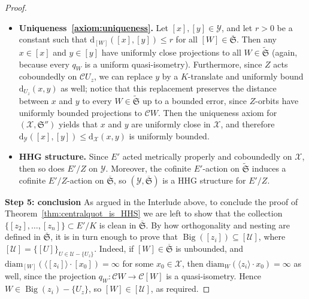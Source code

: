 \documentclass[svgnames]{amsart}
\theoremstyle{plain}
\theoremstyle{definition}
\newcommand{\cal}[1]{\mathcal{#1}}
\newcommand{\frakS}{\mathfrak{S}}
\newcommand{\C}{\cal C}
\newcommand{\Bigdom}[1]{\operatorname{Big}\left(#1\right)}
\newcommand{\diam}{\mathrm{diam}}
\newcommand{\dist}{\mathrm{d}}
\newcommand{\ofS}{\overline{\frakS}}
\newcommand{\wfS}{\widetilde{\frakS}}
\begin{document}
\begin{proof}
\begin{itemize}
        \item \textbf{Uniqueness~\ref{axiom:uniqueness}.} Let $[x],[y]\in\cal Y$, and let $r>0$ be a constant such that $\dist_{[W]}([x],[y])\le r$ for all $[W]\in\ofS$. Then any $x\in [x]$ and $y\in [y]$ have uniformly close projections to all $W\in \wfS$ (again, because every $q_W$ is a uniform quasi-isometry). Furthermore, since $Z$ acts coboundedly on $\C U_z$, we can replace $y$ by a $K$-translate and uniformly bound $\dist_{U_z}(x,y)$ as well; notice that this replacement preserves the distance between $x$ and $y$ to every $W\in \wfS$ up to a bounded error, since $Z$-orbits have uniformly bounded projections to $\C W$. Then the uniqueness axiom for $(\cal X, \frakS'')$ yields that $x$ and $y$ are uniformly close in $\cal X$, and therefore $\dist_{\cal Y}([x],[y])\le \dist_{\cal X}(x,y)$ is uniformly bounded.        
        \item \textbf{HHG structure.} Since $E'$ acted metrically properly and coboundedly on $\cal X$, then so does $E'/Z$ on $\cal Y$. Moreover, the cofinite $E'$-action on $\wfS$ induces a cofinite $E'/Z$-action on $\ofS$, so $(\cal Y, \ofS)$ is a HHG structure for $E'/Z$.
    \end{itemize}

    \par\medskip\textbf{Step 5: conclusion} As argued in the Interlude above, to conclude the proof of Theorem~\ref{thm:centralquot_is_HHS} we are left to show that the collection $\{[z_2],\ldots, [z_n]\}\subset E'/K$ is clean in $\ofS$. By how orthogonality and nesting are defined in $\ofS$, it is in turn enough to prove that $\Bigdom{[z_i]}\subseteq [\cal U]$, where $[\cal U]=\{[U]\}_{U\in \cal U-\{U_z\}}$. Indeed, if $[W]\in \ofS$ is unbounded, and $\diam_{[W]}(\langle [z_i]\rangle \cdot [x_0])=\infty$ for some $x_0\in \cal X$, then $\diam_{W}(\langle z_i\rangle \cdot x_0)=\infty$ as well, since the projection $q_W\colon \C W\to \C [W]$ is a quasi-isometry. Hence $W\in \Bigdom{z_i}-\{U_z\}$, so $[W]\in [\cal U]$, as required.
\end{proof}
\end{document}
